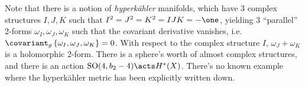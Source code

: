 \begin{remark}

Note that there is a notion of \emph{hyperkähler} manifolds, which have
3 complex structures \(I, J, K\) such that
\(I^2=J^2=K^2 = IJK = -\one\), yielding 3 ``parallel'' 2-forms
\(\omega_I, \omega_J, \omega_K\) such that the covariant derivative
vanishes,
i.e.~\(\covariant_g \left\{{ \omega_I, \omega_J, \omega_K }\right\} = 0\).
With respect to the complex structure \(I\), \(\omega_J + \omega_K\) is
a holomorphic 2-form. There is a sphere's worth of almost complex
structures, and there is an action
\({\operatorname{SO}}(4, b_2 - 4) \acts H^*(X)\). There's no known
example where the hyperkähler metric has been explicitly written down.

\end{remark}

\cleardoublepage

\renewcommand{\listtheoremname}{}
\listoftheorems[ignoreall,show={definition}, numwidth=3.5em]
\cleardoublepage

\renewcommand{\listtheoremname}{}
\listoftheorems[ignoreall,show={theorem,proposition}, numwidth=3.5em]
\cleardoublepage

\renewcommand{\listtheoremname}{}
\listoftheorems[ignoreall,show={exercise}, numwidth=3.5em]
\cleardoublepage

\listoffigures
\cleardoublepage


\printbibliography[title=Bibliography]



